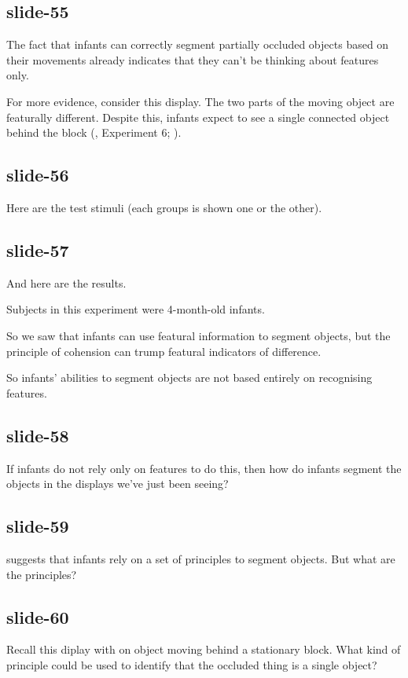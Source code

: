 \documentclass[12pt,\papersize]{extarticle}
\begin{document}
\subsection{slide-55}
The fact that infants can correctly segment partially occluded objects based on their movements 
already indicates that they can't be thinking about features only.
 
For more evidence, consider this display.
The two parts of the moving object are featurally different.
Despite this, infants expect to see a single connected object behind the block 
(\citealp{kellman:1983_perception}, Experiment 6; \citealp{Spelke:1990jn}).
 
\subsection{slide-56}
Here are the test stimuli (each groups is shown one or the other).
 
\subsection{slide-57}
And here are the results.
 
Subjects in this experiment were 4-month-old infants.
 
So we saw that infants can use featural information to segment objects, 
but the principle of cohension can trump featural indicators of difference.
 
So infants' abilities to segment objects are not based entirely on recognising features.
 
\subsection{slide-58}
If infants do not rely only on features to do this, then
how do infants segment the objects in the displays we've just been seeing?
 
\subsection{slide-59}
\citet{Spelke:1990jn} suggests that infants rely on a set of principles to segment objects.
But what are the principles?
 
\subsection{slide-60}
Recall this diplay with on object moving behind a stationary block.
What kind of principle could be used to identify that the occluded thing is a single object?
 
\end{document}
